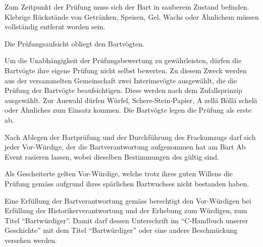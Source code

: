 \documentclass[fontsize=12pt,parskip=half]{scrartcl}
\begin{document}
\begin{contract}
  \SubClause[title={Zustand des Bartes}]
  Zum Zeitpunkt der Prüfung muss sich der Bart in sauberem Zustand befinden. Klebrige Rückstände von Getränken,
  Speisen, Gel, Wachs oder Ähnlichem müssen vollständig entfernt worden sein.

  \SubClause[title={Prüfungsaufsicht}]
  Die Prüfungsaufsicht obliegt den Bartvögten.

  \SubClause[title={Prüfung der Bartvögte}]
  Um die Unabhängigkeit der Prüfungsbewertung zu gewährleisten, dürfen die Bartvögte ihre eigene Prüfung nicht selbst bewerten.
  Zu diesem Zweck werden aus der versammelten Gemeinschaft zwei Interimsvögte ausgewählt, die die Prüfung
  der Bartvögte beaufsichtigen. Diese werden nach dem Zufallsprinzip ausgewählt. Zur Auswahl dürfen Würfel,
  Schere-Stein-Papier, A zellä Böllä schelä oder Ähnliches zum Einsatz kommen. Die Bartvögte legen die
  Prüfung als erste ab.

  \Clause[title={BartAb}]
  Nach Ablegen der Bartprüfung und der Durchführung des Frackumzugs darf sich jeder Vor-Würdige, der die Bartverantwortung aufgenommen
  hat am Bart Ab Event rasieren lassen, wobei dieselben Bestimmungen des  gültig sind.

  \Clause[title={Gescheiterte}]\label{B.gescheiterte}
  Als Gescheiterte gelten Vor-Würdige, welche trotz ihres guten Willens die Prüfung gemäss 
  aufgrund ihres spärlichen Bartwuchses nicht bestanden haben.

  \Clause[title={Titel}]\label{B.barttitel}
  Eine Erfüllung der Bartverantwortung gemäss  berechtigt den Vor-Würdigen bei Erfüllung der Historikerverantwortung 
  und der Erhebung zum Würdigen, zum Titel ``Bartwürdiger''. Damit darf dessen Unterschrift im ``C-Handbuch unserer Geschichte'' mit dem Titel ``Bartwürdiger'' oder eine andere
  Beschmückung versehen werden.

\end{contract}

\pagebreak
\end{document}
